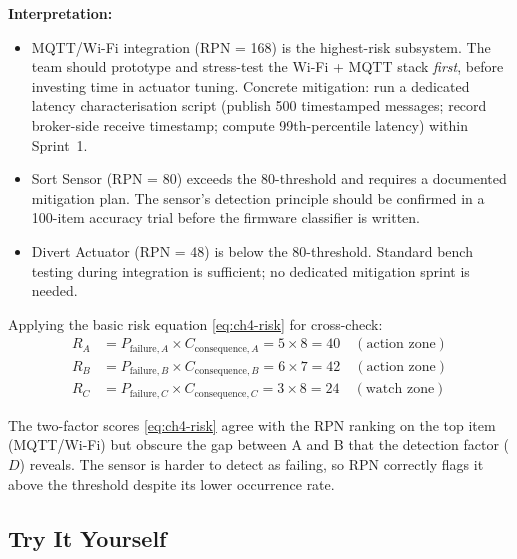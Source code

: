 \noindent\textbf{Interpretation:}
\begin{itemize}
  \item MQTT/Wi-Fi integration (RPN = 168) is the highest-risk subsystem.
        The team should prototype and stress-test the Wi-Fi + MQTT stack \emph{first}, before investing time in actuator tuning.
        Concrete mitigation: run a dedicated latency characterisation script (publish 500 timestamped messages; record broker-side receive timestamp; compute 99th-percentile latency) within Sprint~1.
  \item Sort Sensor (RPN = 80) exceeds the 80-threshold and requires a documented mitigation plan.
        The sensor's detection principle should be confirmed in a 100-item accuracy trial before the firmware classifier is written.
  \item Divert Actuator (RPN = 48) is below the 80-threshold.
        Standard bench testing during integration is sufficient; no dedicated mitigation sprint is needed.
\end{itemize}

Applying the basic risk equation \eqref{eq:ch4-risk} for cross-check:
\begin{align*}
  R_A &= P_{\text{failure},A} \times C_{\text{consequence},A} = 5 \times 8 = 40 \quad (\text{action zone})\\
  R_B &= P_{\text{failure},B} \times C_{\text{consequence},B} = 6 \times 7 = 42 \quad (\text{action zone})\\
  R_C &= P_{\text{failure},C} \times C_{\text{consequence},C} = 3 \times 8 = 24 \quad (\text{watch zone})
\end{align*}

The two-factor scores \eqref{eq:ch4-risk} agree with the RPN ranking on the top item (MQTT/Wi-Fi) but obscure the gap between A and B that the detection factor ($D$) reveals.
The sensor is harder to detect as failing, so RPN correctly flags it above the threshold despite its lower occurrence rate.

\subsection{Try It Yourself}
\label{subsec:ch4-try-it}

